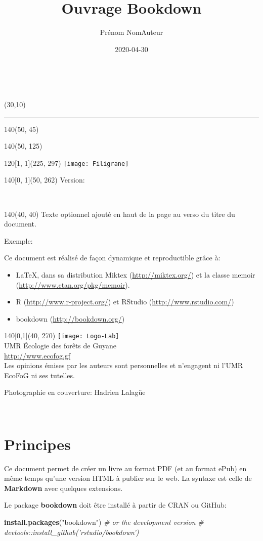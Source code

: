 \documentclass[
  11pt,
  french,
  a4paper,
  extrafontsizes,onecolumn,openright
  ]{memoir}
\title{Ouvrage Bookdown}
\author{Prénom NomAuteur}
\date{2020-04-30}
\newenvironment{Shaded}{\begin{snugshade}}{\end{snugshade}}
\newcommand{\CommentTok}[1]{\textcolor[rgb]{0.56,0.35,0.01}{\textit{#1}}}
\newcommand{\KeywordTok}[1]{\textcolor[rgb]{0.13,0.29,0.53}{\textbf{#1}}}
\newcommand{\NormalTok}[1]{#1}
\newcommand{\StringTok}[1]{\textcolor[rgb]{0.31,0.60,0.02}{#1}}
\newcommand{\MainTitlePage}[1][]{
	\SmallMargins %
	\pagestyle{empty} %
	~\\ %
	\begin{textblock}{2}(30,10)
		\rule{1pt}{\paperheight-20mm}
	\end{textblock}
	\begin{textblock}{140}(50, 45)
		\flushright
		\begin{Spacing}{3}
			{\fontfamily{qtm}\selectfont\fontsize{45}{45}\selectfont \textsc{\thetitle}}
		\end{Spacing}
	\end{textblock}
	\begin{textblock}{140}(50, 125)
		\flushright
		{\fontfamily{qtm}\Large \theauthor}
	\end{textblock}
	\begin{textblock}{120}[1, 1](225, 297)
		\texttt{[image: Filigrane]}
	 \end{textblock}
	\begin{textblock}{140}[0, 1](50, 262)
		\normalfont	Version: \thedate
	\end{textblock}
	\newpage
	~\\ %
	\begin{textblock}{140}(40, 40)
		#1
	\end{textblock}
	\begin{textblock}{140}[0,1](40, 270)
		\centering
    \texttt{[image: Logo-Lab]}\\ \bigskip
		UMR \'Ecologie des forêts de Guyane\\
		\url{http://www.ecofog.gf}\\[3\baselineskip]
		Les opinions émises par les auteurs sont personnelles et n’engagent ni l’UMR EcoFoG ni ses tutelles.

    \tiny{Photographie en couverture: Hadrien Lalagüe}
	\end{textblock}
	\newpage
}
\begin{document}
\frontmatter


\MainTitlePage[Texte optionnel ajouté en haut de la page au verso du titre du document.

Exemple:

Ce document est réalisé de façon dynamique et reproductible grâce à:

\begin{itemize}
  \item \LaTeX, dans sa distribution Miktex (\url{http://miktex.org/}) et la classe memoir (\url{http://www.ctan.org/pkg/memoir}).
  \item R (\url{http://www.r-project.org/}) et RStudio (\url{http://www.rstudio.com/})
  \item bookdown (\url{http://bookdown.org/})
\end{itemize}]

\makeflyleaf
\newpage
~
\newpage









\LargeMargins
{
\hypersetup{linkcolor=}
\setcounter{tocdepth}{3}
\tableofcontents
}



\LargeMargins
\hypertarget{principes}{%
\chapter*{Principes}\label{principes}}

Ce document permet de créer un livre au format PDF (et au format ePub) en même temps qu'une version HTML à publier sur le web.
La syntaxe est celle de \textbf{Markdown} avec quelques extensions.

Le package \textbf{bookdown} doit être installé à partir de CRAN ou GitHub:

\scriptsize

\begin{Shaded}
\begin{Highlighting}[]
\KeywordTok{install.packages}\NormalTok{(}\StringTok{"bookdown"}\NormalTok{)}
\CommentTok{# or the development version}
\CommentTok{# devtools::install_github('rstudio/bookdown')}
\end{Highlighting}
\end{Shaded}
\end{document}
